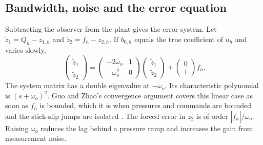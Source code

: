 \subsection{Bandwidth, noise and the error equation}

Subtracting the observer from the plant gives the error system. Let $\tilde{z}_1 = Q_h - z_{1,h}$ and $\tilde{z}_2 = f_h - z_{2,h}$. If $b_{0,h}$ equals the true coefficient of $u_h$ and varies slowly,
\begin{equation}
\label{eq:error-sys}
\begin{pmatrix} \dot{\tilde{z}}_1 \\ \dot{\tilde{z}}_2 \end{pmatrix}
=
\begin{pmatrix} -2\omega_o & 1 \\ -\omega_o^2 & 0 \end{pmatrix}
\begin{pmatrix} \tilde{z}_1 \\ \tilde{z}_2 \end{pmatrix}
+
\begin{pmatrix} 0 \\ 1 \end{pmatrix} \dot{f}_h.
\end{equation}
The system matrix has a double eigenvalue at $-\omega_o$. Its characteristic polynomial is $(s+\omega_o)^2$. Guo and Zhao's convergence argument covers this linear case as soon as $\dot{f}_h$ is bounded, which it is when pressures and commands are bounded and the stick-slip jumps are isolated \cite{guo2011convergence,huang2014methodology}. The forced error in $z_2$ is of order $|\dot{f}_h|/\omega_o$. Raising $\omega_o$ reduces the lag behind a pressure ramp and increases the gain from measurement noise.

